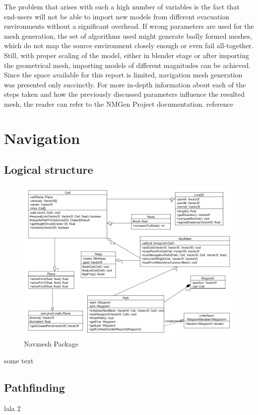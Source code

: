 \documentclass[a4paper,11pt]{article}
\begin{document}
The problem that arises with such a high number of variables is the fact that end-users will not be able to import new models from different evacuation environments without a significant overhead. If wrong parameters are used for the mesh generation, the set of algorithms used might generate badly formed meshes, which do not map the source environment closely enough or even fail all-together.
Still, with proper scaling of the model, either in blender stage or after importing the geometrical mesh, importing models of different magnitudes can be achieved.
Since the space available for this report is limited, navigation mesh generation was presented only succinctly. For more in-depth information about each of the steps taken and how the previously discussed parameters influence the resulted mesh, the reader can refer to the NMGen Project documentation. {reference}
\section{Navigation}

\subsection{Logical structure}

\begin{figure}[H]
	\centering
	\includegraphics[width=1\textwidth]{navmesh.png}
	\caption{Navmesh Package}
\end{figure}

some text

\subsection{Pathfinding}
  
lala 2
\end{document}
